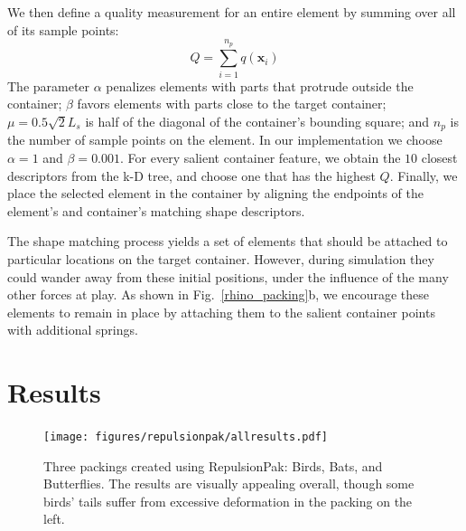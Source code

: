 We then define a quality measurement for an entire element by summing over
all of its sample points:
\begin{equation}
Q = \sum_{i = 1}^{n_p} q(\bm{x}_i)
\end{equation}
The parameter $\alpha$ penalizes elements with parts that protrude outside
the container; $\beta$ favors elements with parts close to the target container; 
$\mu = 0.5 \sqrt{2}L_{s}$ is half of the diagonal of the container's
bounding square; and $n_p$ is the number of sample points on the element.
In our implementation we choose $\alpha = 1$ and $\beta = 0.001$.
For every salient container feature, we obtain the $10$ closest descriptors from the k-D tree, and choose one that has the highest $Q$.
Finally, we place the selected element in the container by 
aligning the endpoints of the element's and container's matching shape 
descriptors.

The shape matching process yields a set of elements that should be attached
to particular locations on the target container.  However, during simulation
they could wander away from these initial positions, under the influence of
the many other forces at play.  As shown in Fig.~\ref{rhino_packing}b, we
encourage these elements to remain in place by attaching them to the salient
container points with additional springs.

\section{Results}
\label{repulsionpak_results}



\begin{figure}
\centering
\texttt{[image: figures/repulsionpak/allresults.pdf]} 
\caption[Three packings created using RepulsionPak: Birds, Bats, and Butterflies]
{\label{three_packings} Three packings created using RepulsionPak: \newline Birds, Bats, and Butterflies. The results are visually appealing overall,
though some birds' tails suffer from excessive deformation in
the packing on the left.}
\end{figure}

